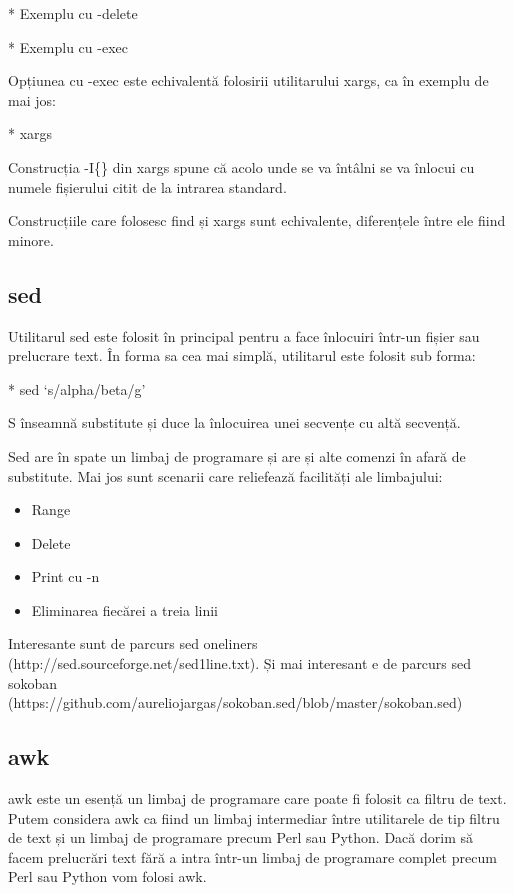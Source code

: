 * Exemplu cu -delete

* Exemplu cu -exec

Opțiunea cu -exec este echivalentă folosirii utilitarului xargs, ca în exemplu
de mai jos:

* xargs

Construcția -I\{\} din xargs spune că acolo unde se va întâlni {} se va înlocui cu
numele fișierului citit de la intrarea standard.

Construcțiile care folosesc find și xargs sunt echivalente, diferențele între
ele fiind minore.

\subsection{sed}
\label{sec:cli-sed}

Utilitarul sed este folosit în principal pentru a face înlocuiri într-un fișier
sau prelucrare text. În forma sa cea mai simplă, utilitarul este folosit sub
forma:

* sed ‘s/alpha/beta/g’

S înseamnă substitute și duce la înlocuirea unei secvențe cu altă secvență.

Sed are în spate un limbaj de programare și are și alte comenzi în afară de
substitute. Mai jos sunt scenarii care reliefează facilități ale limbajului:

\begin{itemize}
	\item Range
	\item Delete
	\item Print cu -n
	\item Eliminarea fiecărei a treia linii
\end{itemize}

Interesante sunt de parcurs sed oneliners
(http://sed.sourceforge.net/sed1line.txt). Și mai interesant e de parcurs sed
sokoban (https://github.com/aureliojargas/sokoban.sed/blob/master/sokoban.sed)

\subsection{awk}
\label{sec:cli-awk}

awk este un esență un limbaj de programare care poate fi folosit ca filtru de
text. Putem considera awk ca fiind un limbaj intermediar între utilitarele de
tip filtru de text și un limbaj de programare precum Perl sau Python. Dacă dorim
să facem prelucrări text fără a intra într-un limbaj de programare complet
precum Perl sau Python vom folosi awk.

